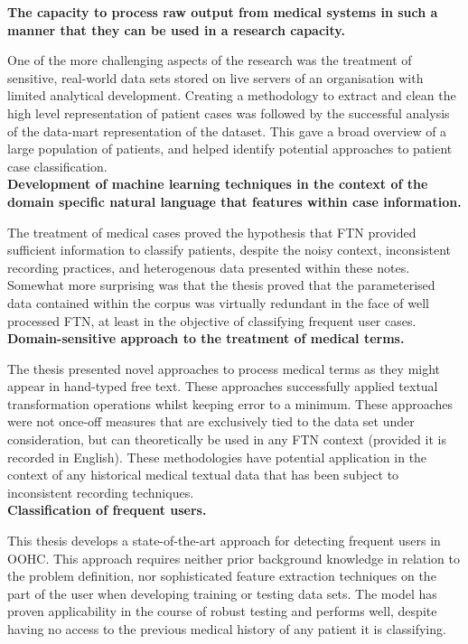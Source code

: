 \noindent\textbf{The capacity to process raw output from medical systems in such a manner that they can be used in a research capacity.}

One of the more challenging aspects of the research was the treatment of sensitive, real-world data sets stored on live servers of an organisation with limited analytical development. Creating a methodology to extract and clean the high level representation of patient cases was followed by the successful analysis of the data-mart representation of the dataset. This gave a broad overview of a large population of patients, and helped identify potential approaches to patient case classification.\\


\noindent\textbf{Development of machine learning techniques in the context of the domain specific natural language that features within case information.} 

The treatment of medical cases proved the hypothesis that FTN provided sufficient information to classify patients, despite the noisy context, inconsistent recording practices, and heterogenous data presented within these notes. Somewhat more surprising was that the thesis proved that the parameterised data contained within the corpus was virtually redundant in the face of well processed FTN, at least in the objective of classifying frequent user cases. \\

\noindent \textbf{Domain-sensitive approach to the treatment of medical terms.} 

The thesis presented novel approaches to process medical terms as they might appear in hand-typed free text. These approaches successfully applied textual transformation operations whilst keeping error to a minimum. These approaches were not once-off measures that are exclusively tied to the data set under consideration, but can theoretically be used in any FTN context (provided it is recorded in English). These methodologies have potential application in the context of any historical medical textual data that has been subject to inconsistent recording techniques. \\

\noindent \textbf{Classification of frequent users.} 

This thesis develops a state-of-the-art approach for detecting frequent users in OOHC. This approach requires neither prior background knowledge in relation to the problem definition, nor sophisticated feature extraction techniques on the part of the user when developing training or testing data sets. The model has proven applicability in the course of robust testing and performs well, despite having no access to the previous medical history of any patient it is classifying.     


